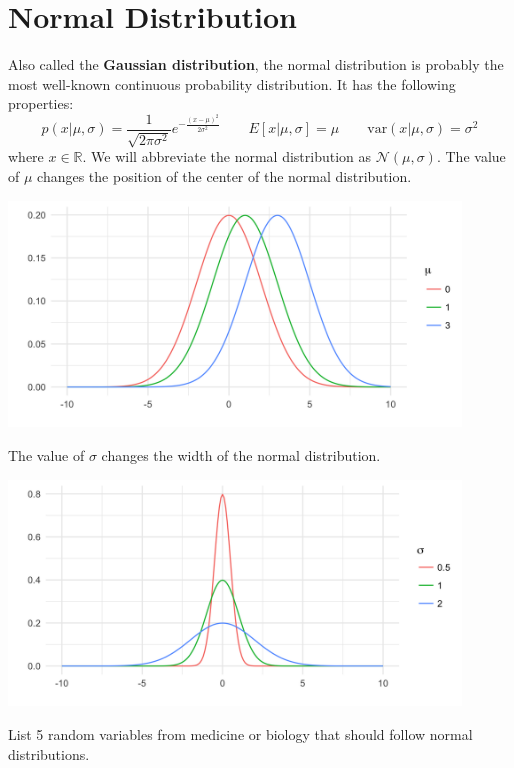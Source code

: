 \section{Normal Distribution} 

Also called the \textbf{Gaussian distribution}, the normal distribution is probably the most well-known continuous probability distribution. It has the following properties:
\begin{equation*} p(x | \mu, \sigma) = \frac{1}{\sqrt{2 \pi \sigma^2}} e^{-\frac{(x-\mu)^2}{2 \sigma^2}} \qquad  E[x| \mu, \sigma] = \mu \qquad \text{var}(x | \mu, \sigma) = \sigma^2 \end{equation*}
where $x \in \mathbb{R}$. We will abbreviate the normal distribution as $\mathcal{N}(\mu, \sigma)$.  The value of $\mu$ changes the position of the center of the normal distribution.
\begin{center}
\includegraphics[width=0.9\textwidth]{img/l01-figure1a-normal-mean-change.png}
\end{center}
The value of $\sigma$ changes the width of the normal distribution.
\begin{center}
\includegraphics[width=0.9\textwidth]{img/l01-figure1b-normal-sd-change.png}
\end{center}

\begin{question}{}
List 5 random variables from medicine or biology that should follow normal distributions.
\end{question}
 


